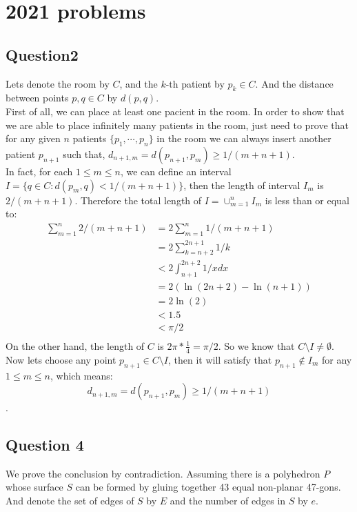 \documentclass[pdf]{article}
\begin{document}
\section{2021 problems}

\subsection{Question2}
Lets denote the room by $C$, and the $k$-th patient by $p_k\in C$. And the distance between points $p,q \in C$ by $d(p,q)$.\\

First of all, we can place at least one pacient in the room. In order to show that we are able to place infinitely many patients in the room, just need to prove that for any given $n$ patients $\{p_1,\cdots, p_n\}$ in the room we can always insert another patient $p_{n+1}$ such that, $d_{n+1, m} = d(p_{n+1}, p_m)\geq 1/(m+n+1)$.\\

In fact, for each $1\leq m\leq n$, we can define an interval $I = \{q\in C: d(p_m, q)< 1/(m+n+1)\}$, then the length of interval $I_m$ is $2/(m+n+1)$. Therefore the total length of $I = \cup_{m=1}^nI_m$ is less than or equal to:
\begin{align*}
\sum\limits_{m=1}^n 2/(m+n+1)&= 2\sum\limits_{m=1}^n 1/(m+n+1)\\
					&= 2\sum\limits_{k=n+2}^{2n+1} 1/k\\
					&< 2\int_{n+1}^{2n+2}1/xdx\\
					&= 2(\ln(2n+2) - \ln(n+1))\\
					&= 2\ln(2)\\
					&< 1.5\\
					&< \pi/2\\
\end{align*}
On the other hand, the length of $C$ is $2\pi*\frac{1}{4} = \pi/2$. So we know that $C\setminus I\neq \emptyset$. Now lets choose any point $p_{n+1}\in C\setminus I$, then it will satisfy that $p_{n+1}\not\in I_m$ for any $1\leq m\leq n$, which means:
$$d_{n+1, m} = d(p_{n+1}, p_m)\geq 1/(m+n+1)$$.
\newpage
\subsection{Question 4}
We prove the conclusion by contradiction. Assuming there is a polyhedron $P$ whose surface $S$ can be formed by gluing together 43 equal non-planar 47-gons. And denote the set of edges of $S$ by $E$ and the number of edges in $S$ by $e$. 
\end{document}
